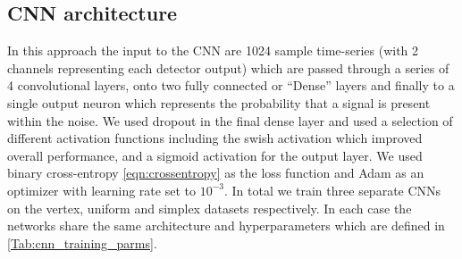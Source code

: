 \documentclass[12pt]{iopart}
\begin{document}
\subsection{CNN architecture}
In this approach the input to the \ac{CNN} are 1024 sample time-series (with 2 channels representing each detector output) which are passed through a series of 4 convolutional layers, onto two fully connected or ``Dense'' layers and finally to a single output neuron which represents the probability that a signal is present within the noise. We used dropout in the final dense layer and used a selection of different activation functions including the swish activation \cite{ramachandran2017searching} which improved overall performance, and a sigmoid activation for the output layer. We used binary cross-entropy \cref{eqn:crossentropy} as the loss function and Adam as an optimizer with learning rate set to $10^{-3}$. In total we train three separate \acp{CNN} on the vertex, uniform and simplex datasets respectively. In each case the networks share the same architecture and hyperparameters which are defined in \cref{Tab:cnn_training_parms}.
\end{document}

